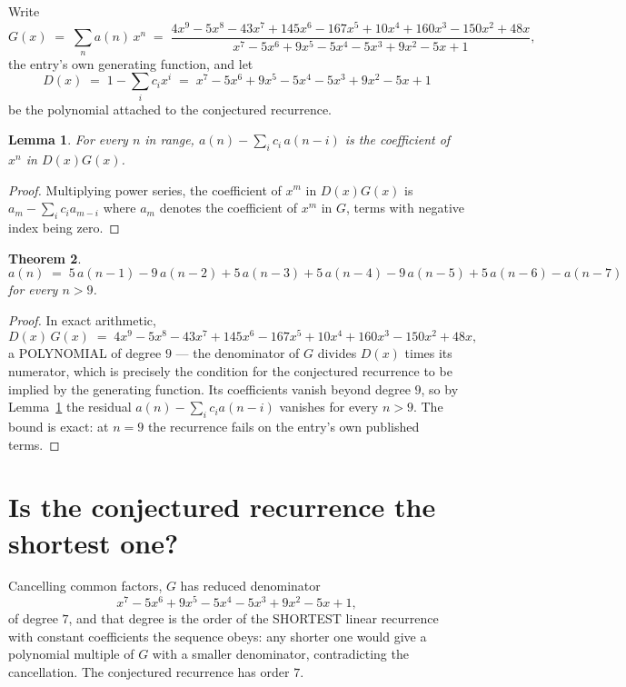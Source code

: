 \documentclass[11pt,a4paper]{article}
\theoremstyle{plain}
\newtheorem{theorem}{Theorem}
\newtheorem{lemma}[theorem]{Lemma}
\theoremstyle{definition}
\begin{document}
Write
\[
G(x)\;=\;\sum_{n}a(n)\,x^{n}\;=\;\frac{4 x^{9} - 5 x^{8} - 43 x^{7} + 145 x^{6} - 167 x^{5} + 10 x^{4} + 160 x^{3} - 150 x^{2} + 48 x}{x^{7} - 5 x^{6} + 9 x^{5} - 5 x^{4} - 5 x^{3} + 9 x^{2} - 5 x + 1},
\]
the entry's own generating function, and let
\[
D(x)\;=\;1-\sum_i c_i x^{i}\;=\;x^{7} - 5 x^{6} + 9 x^{5} - 5 x^{4} - 5 x^{3} + 9 x^{2} - 5 x + 1
\]
be the polynomial attached to the conjectured recurrence.

\begin{lemma}\label{lem:key}
For every $n$ in range, $a(n)-\sum_i c_i\,a(n-i)$ is the coefficient of $x^{n}$ in
$D(x)G(x)$.
\end{lemma}

\begin{proof}
Multiplying power series, the coefficient of $x^{m}$ in $D(x)G(x)$ is
$a_m-\sum_i c_i a_{m-i}$ where $a_m$ denotes the coefficient of $x^{m}$ in $G$, terms with
negative index being zero.
\end{proof}

\begin{theorem}
\[
a(n)\;=\;5\,a(n-1) - 9\,a(n-2) + 5\,a(n-3) + 5\,a(n-4) - 9\,a(n-5) + 5\,a(n-6) - a(n-7)
\]
for every $n>9$.
\end{theorem}

\begin{proof}
In exact arithmetic,
\[
D(x)\,G(x)\;=\;4 x^{9} - 5 x^{8} - 43 x^{7} + 145 x^{6} - 167 x^{5} + 10 x^{4} + 160 x^{3} - 150 x^{2} + 48 x,
\]
a POLYNOMIAL of degree $9$ --- the denominator of $G$ divides $D(x)$ times its numerator,
which is precisely the condition for the conjectured recurrence to be implied by the
generating function. Its coefficients vanish beyond degree $9$, so by
Lemma~\ref{lem:key} the residual $a(n)-\sum_ic_ia(n-i)$ vanishes for every
$n>9$. The bound is exact: at $n=9$ the recurrence fails on the entry's own published terms.
\end{proof}

\section{Is the conjectured recurrence the shortest one?}

Cancelling common factors, $G$ has reduced denominator
\[
x^{7} - 5 x^{6} + 9 x^{5} - 5 x^{4} - 5 x^{3} + 9 x^{2} - 5 x + 1,
\]
of degree $7$, and that degree is the order of the SHORTEST linear recurrence with
constant coefficients the sequence obeys: any shorter one would give a polynomial multiple of
$G$ with a smaller denominator, contradicting the cancellation. The conjectured recurrence has
order $7$.
\end{document}

